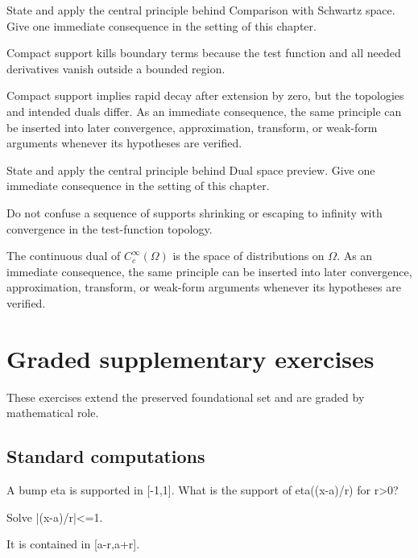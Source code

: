 \begin{exercise}\label{exr:iii15-07}
State and apply the central principle behind Comparison with Schwartz space. Give one immediate consequence in the setting of this chapter.
\end{exercise}
\begin{hint}
Compact support kills boundary terms because the test function and all needed derivatives vanish outside a bounded region.
\end{hint}
\begin{solution}
Compact support implies rapid decay after extension by zero, but the topologies and intended duals differ. As an immediate consequence, the same principle can be inserted into later convergence, approximation, transform, or weak-form arguments whenever its hypotheses are verified.
\end{solution}

\begin{exercise}\label{exr:iii15-08}
State and apply the central principle behind Dual space preview. Give one immediate consequence in the setting of this chapter.
\end{exercise}
\begin{hint}
Do not confuse a sequence of supports shrinking or escaping to infinity with convergence in the test-function topology.
\end{hint}
\begin{solution}
The continuous dual of $C_c^\infty(\Omega)$ is the space of distributions on $\Omega$. As an immediate consequence, the same principle can be inserted into later convergence, approximation, transform, or weak-form arguments whenever its hypotheses are verified.
\end{solution}


\section{Graded supplementary exercises}
These exercises extend the preserved foundational set and are graded by mathematical role.

\subsection*{Standard computations}

\begin{exercise}\label{exr:iii15-expand-01}
A bump eta is supported in [-1,1]. What is the support of eta((x-a)/r) for r>0?
\end{exercise}
\begin{hint}
Solve |(x-a)/r|<=1.
\end{hint}
\begin{solution}
It is contained in [a-r,a+r].
\end{solution}

